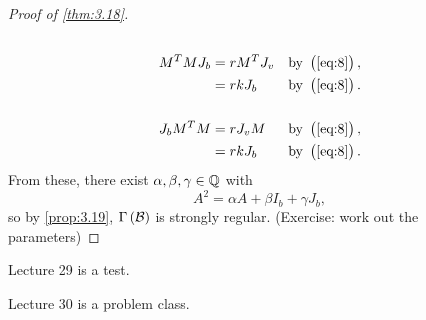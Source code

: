 \begin{proof}[Proof of \ref{thm:3.18}]
\begin{align*}
\\
M^TMJ_b
& = rM^TJ_v & \text{by} \ \br{\ref{eq:8}}, \\
& = rkJ_b & \text{by} \ \br{\ref{eq:8}}. \\
\\
J_bM^TM
& = rJ_vM & \text{by} \ \br{\ref{eq:8}}, \\
& = rkJ_b & \text{by} \ \br{\ref{eq:8}}.
\end{align*}
From these, there exist $ \alpha, \beta, \gamma \in \mathbb{Q} $ with
$$ A^2 = \alpha A + \beta I_b + \gamma J_b, $$
so by \ref{prop:3.19}, $ \Gamma\br{\BB} $ is strongly regular. (Exercise: work out the parameters)
\end{proof}


Lecture 29 is a test.


Lecture 30 is a problem class.

